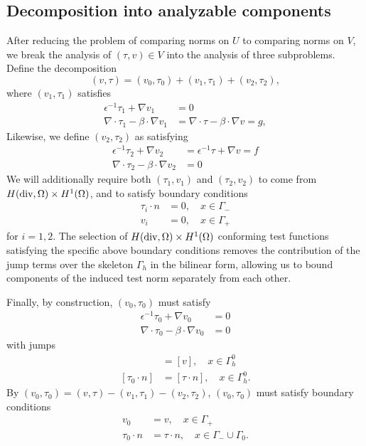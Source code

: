 \documentclass[11pt,onecolumn]{scrartcl}
\newcommand{\grad}{\nabla}
\renewcommand{\div}{\grad \cdot}
\begin{document}
\subsection{Decomposition into analyzable components}
\label{sec:strategy2}

After reducing the problem of comparing norms on $U$ to comparing norms on $V$, we break the analysis of $\left(\tau,v\right) \in V$ into the analysis of three subproblems.  Define the decomposition
\[
\left(v,\tau\right) = \left(v_0,\tau_0\right) + \left(v_1,\tau_1\right) + \left(v_2,\tau_2\right),
\]
where $\left(v_1,\tau_1\right)$ satisfies 
\begin{align*}
\epsilon^{-1}\tau_1 + \grad v_1 &= 0\\
\div \tau_1 - \beta\cdot \grad v_1 &=  \div \tau - \beta\cdot \grad v = g,
\end{align*} 
Likewise, we define $\left(v_2,\tau_2\right)$ as satisfying
\begin{align*}
\epsilon^{-1}\tau_2 + \grad v_2 &= \epsilon^{-1}\tau + \grad v = f\\
\div \tau_2 - \beta\cdot \grad v_2 &= 0
\end{align*}
We will additionally require both $\left(\tau_1,v_1\right)$ and $\left(\tau_2,v_2\right)$ to come from $H({\rm div}, \Omega)\times H^1(\Omega)$, and to satisfy boundary conditions
\begin{align}
\tau_i\cdot n &= 0, \quad x \in \Gamma_- \label{bc_1}\\
v_i &= 0, \quad x \in \Gamma_+ \label{bc_2}
\end{align}
for $i = 1, 2$.  The selection of $H({\rm div}, \Omega)\times H^1(\Omega)$ conforming test functions satisfying the specific above boundary conditions removes the contribution of the jump terms over the skeleton $\Gamma_h$ in the bilinear form, allowing us to bound components of the induced test norm separately from each other.   

Finally, by construction, $\left(v_0,\tau_0\right)$ must satisfy 
\begin{align*}
\epsilon^{-1}\tau_0 + \grad v_0 &= 0\\
\div \tau_0 - \beta\cdot \grad v_0 &= 0
\end{align*}
with jumps
\begin{align*}
[v_0] &= [v], \quad x\in \Gamma_h^0\\
[\tau_0 \cdot n] &= [\tau \cdot n], \quad x\in \Gamma_h^0.
\end{align*}
By $\left(v_0,\tau_0\right) = \left(v,\tau\right) - \left(v_1,\tau_1\right) - \left(v_2,\tau_2\right)$, $\left(v_0,\tau_0\right)$ must satisfy boundary conditions
\begin{align}
v_0 &= v, \quad x\in \Gamma_+ \label{bc_1}\\
\tau_0 \cdot n &= \tau \cdot n, \quad x\in \Gamma_-\cup \Gamma_0. \label{bc_2}
\end{align}
\end{document}
